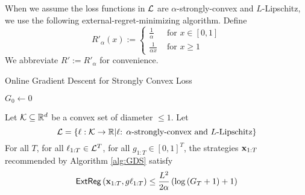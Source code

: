 When we assume the loss functions in $\mathcal{L}$ are $\alpha$-strongly-convex and $L$-Lipschitz, we use the following external-regret-minimizing algorithm. Define
\begin{equation*}
    R'_{\alpha}(x) := \begin{cases}
        \frac{1}{\alpha} & \text{ for }x \in [0,1]\\
        \frac{1}{\alpha x} & \text{ for } x \geq 1
    \end{cases}
\end{equation*}
We abbreviate $R' := R'_{\alpha}$ for convenience.

\begin{algorithm}
\caption{Online Gradient Descent for Strongly Convex Loss}
\label{alg:GDS}

$G_0 \gets 0$


\end{algorithm}






















\begin{lemma}\label{lemma:GDS}
    Let $\mathcal{K} \subseteq \mathbb{R}^d$ be a convex set of diameter $\leq 1$.  Let $$\mathcal{L} = \left\{\ell: \mathcal{K} \to \mathbb{R}|\text{$\ell$: $\alpha$-strongly-convex and $L$-Lipschitz}\right\}$$  For all $T$, for all $\ell_{1:T} \in \mathcal{L}^T$, for all $g_{1:T} \in [0,1]^T$, the strategies $\mathbf{x}_{1:T}$ recommended by Algorithm \ref{alg:GDS} satisfy
    \begin{equation*}
        \mathsf{ExtReg}\left(\mathbf{x}_{1:T},g\ell_{1:T}\right) \leq \frac{L^2}{2\alpha}\left(\log\left(G_T+1\right)+1\right)
    \end{equation*}
\end{lemma}

